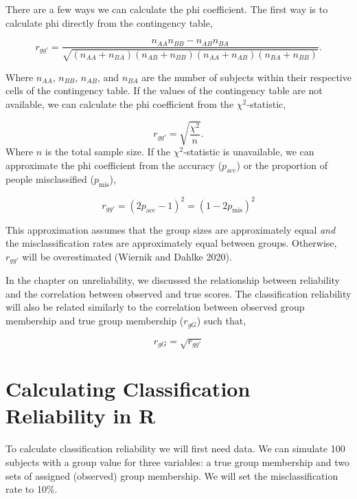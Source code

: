 \documentclass[
  letterpaper,
  DIV=11,
  numbers=noendperiod]{scrreprt}
\begin{document}
There are a few ways we can calculate the phi coefficient. The first way
is to calculate phi directly from the contingency table,

\[
r_{gg'} = \frac{n_{AA}n_{BB}-n_{AB}n_{BA}}{\sqrt{(n_{AA}+n_{BA})(n_{AB}+n_{BB})(n_{AA}+n_{AB})(n_{BA}+n_{BB})}}.
\]

Where \(n_{AA}\), \(n_{BB}\), \(n_{AB}\), and \(n_{BA}\) are the number
of subjects within their respective cells of the contingency table. If
the values of the contingency table are not available, we can calculate
the phi coefficient from the \(\chi^2\)-statistic,

\[
r_{gg'} = \sqrt{\frac{\chi^2}{n}}.
\] Where \(n\) is the total sample size. If the \(\chi^2\)-statistic is
unavailable, we can approximate the phi coefficient from the accuracy
(\(p_{\text{acc}}\)) or the proportion of people misclassified
(\(p_{\text{mis}}\)),

\[
r_{gg'} = (2p_{\text{acc}}-1)^2 = (1-2p_{\text{mis}})^2
\]

This approximation assumes that the group sizes are approximately equal
\emph{and} the misclassification rates are approximately equal between
groups. Otherwise, \(r_{gg'}\) will be overestimated (Wiernik and Dahlke
2020).

In the chapter on unreliability, we discussed the relationship between
reliability and the correlation between observed and true scores. The
classification reliability will also be related similarly to the
correlation between observed group membership and true group membership
(\(r_{gG}\)) such that,

\[
r_{gG}=\sqrt{r_{gg'}}
\]

\hypertarget{calculating-classification-reliability-in-r}{%
\section{Calculating Classification Reliability in
R}\label{calculating-classification-reliability-in-r}}

To calculate classification reliability we will first need data. We can
simulate 100 subjects with a group value for three variables: a true
group membership and two sets of assigned (observed) group membership.
We will set the misclassification rate to 10\%.
\end{document}
